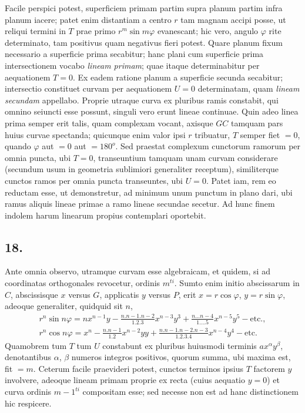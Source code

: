 \documentclass[14pt]{memoir}
\theoremstyle{plain}
\theoremstyle{remark}
\begin{document}
Facile perspici potest, superficiem primam partim supra planum partim infra planum iacere; patet enim distantiam a centro \(r\) tam magnam accipi posse, ut reliqui termini in \(T\) prae primo \(r^m \sin m \varphi\) evanescant; hic vero, angulo \(\varphi\) rite determinato, tam positivus quam negativus fieri potest. Quare planum fixum necessario a superficie prima secabitur; hanc plani cum superficie prima intersectionem vocabo \textit{lineam primam}; quae itaque determinabitur per aequationem \(T = 0\). Ex eadem ratione planum a superficie secunda secabitur; intersectio constituet curvam per aequationem \(U = 0\) determinatam, quam \textit{lineam secundam} appellabo. Proprie utraque curva ex pluribus ramis constabit, qui omnino seiuncti esse possunt, singuli vero erunt lineae continuae. Quin adeo linea prima semper erit talis, quam complexam vocant, axisque \(GC\) tamquam pars huius curvae spectanda; quicunque enim valor ipsi \(r\) tribuatur, \(T\) semper fiet \(= 0\), quando \(\varphi\) aut \(= 0\) aut \(= 180^o\). Sed praestat complexum cunctorum ramorum per omnia puncta, ubi \(T = 0\), transeuntium tamquam unam curvam considerare (secundum usum in geometria sublimiori generaliter receptum), similiterque cunctos ramos per omnia puncta transeuntes, ubi \(U=0\). Patet iam, rem eo reductam esse, ut demonstretur, ad minimum unum punctum in plano dari, ubi ramus aliquis lineae primae a ramo lineae secundae secetur. Ad hunc finem indolem harum linearum propius contemplari oportebit.

\subsection*{18.}

Ante omnia observo, utramque curvam esse algebraicam, et quidem, si ad coordinatas orthogonales revocetur, ordinis \(m^{ti}\).   Sumto enim initio abscissarum in \(C\), abscissisque \(x\) versus \(G\), applicatis \(y\) versus \(P\), erit \(x = r \cos \varphi\), \(y = r \sin \varphi \), adeoque generaliter, quidquid sit \(n\), \begin{align*} r^n \sin n \varphi = nx^{n-1}y - \tfrac{n . n-1 . n-2}{1 . 2 . 3} x^{n-3} y^3 + \tfrac{n \dots n-4}{1 \dots . 5} x^{n-5}y^5 - \text{etc.}, \\ r^n \cos n \varphi = x^n - \tfrac{n . n-1}{1 . 2} x^{n-2} yy + \tfrac{n . n-1 . n-2 . n-3 }{ 1 . 2 . 3 . 4} x^{n-4}y^4 - \text{etc.} \end{align*} Quamobrem tum \(T\) tum \(U\) constabunt ex pluribus huiusmodi terminis \(a x^{\alpha} y^{\beta} \), denotantibus \(\alpha\), \(\beta\) numeros integros positivos, quorum summa, ubi maxima est, fit \(= m\). Ceterum facile praevideri potest, cunctos terminos ipsius \(T\) factorem \(y\) involvere, adeoque lineam primam proprie ex recta (cuius aequatio \(y = 0\)) et curva ordinis \({m-1}^{ti}\) compositam esse; sed necesse non est ad hanc distinctionem hic respicere.
\end{document}
